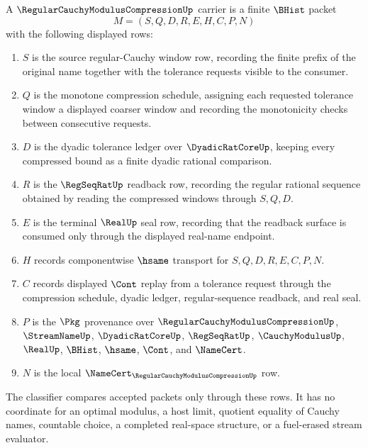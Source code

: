 \begin{definition}
\label{def:regular-cauchy-modulus-compression-carrier}
A $\RegularCauchyModulusCompressionUp$ carrier is a finite $\BHist$ packet
$$
M=(S,Q,D,R,E,H,C,P,N)
$$
with the following displayed rows:
\begin{enumerate}
\item $S$ is the source regular-Cauchy window row, recording the finite prefix of the original name together with the tolerance requests visible to the consumer.
\item $Q$ is the monotone compression schedule, assigning each requested tolerance window a displayed coarser window and recording the monotonicity checks between consecutive requests.
\item $D$ is the dyadic tolerance ledger over $\DyadicRatCoreUp$, keeping every compressed bound as a finite dyadic rational comparison.
\item $R$ is the $\RegSeqRatUp$ readback row, recording the regular rational sequence obtained by reading the compressed windows through $S,Q,D$.
\item $E$ is the terminal $\RealUp$ seal row, recording that the readback surface is consumed only through the displayed real-name endpoint.
\item $H$ records componentwise $\hsame$ transport for $S,Q,D,R,E,C,P,N$.
\item $C$ records displayed $\Cont$ replay from a tolerance request through the compression schedule, dyadic ledger, regular-sequence readback, and real seal.
\item $P$ is the $\Pkg$ provenance over $\RegularCauchyModulusCompressionUp$, $\StreamNameUp$, $\DyadicRatCoreUp$, $\RegSeqRatUp$, $\CauchyModulusUp$, $\RealUp$, $\BHist$, $\hsame$, $\Cont$, and $\NameCert$.
\item $N$ is the local $\NameCert_{\RegularCauchyModulusCompressionUp}$ row.
\end{enumerate}
The classifier compares accepted packets only through these rows. It has no coordinate for an optimal modulus, a host limit, quotient equality of Cauchy names, countable choice, a completed real-space structure, or a fuel-erased stream evaluator.
\end{definition}


